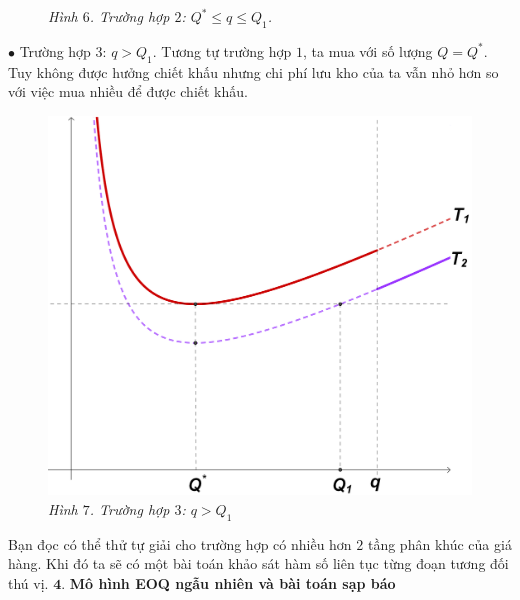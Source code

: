 \begin{multicols}{2}
\begin{figure}[H]
		\caption{\small\textit{\color{toanhocdoisong}Hình $6$. Trường hợp $2$: $Q^* \le q \le Q_1$.}}
		\vspace*{-10pt}
	\end{figure}
	$\bullet$ Trường hợp $3$: $q>Q_1$. Tương tự trường hợp $1$, ta mua với số lượng $Q=Q^*$. Tuy không được hưởng chiết khấu nhưng chi phí lưu kho của ta vẫn nhỏ hơn so với việc mua nhiều để được chiết khấu.
	\begin{figure}[H]
		\centering
		\captionsetup{labelformat= empty, justification=centering}
		\includegraphics[width= 1\linewidth]{8}
		\caption{\small\textit{\color{toanhocdoisong}Hình $7$. Trường hợp $3$: $q>Q_1$}}
		\vspace*{-10pt}
	\end{figure}
	Bạn đọc có thể thử tự giải cho trường hợp có nhiều hơn $2$ tầng phân khúc của giá hàng. Khi đó ta sẽ có một bài toán khảo sát hàm số liên tục từng đoạn tương đối thú vị.
	\vskip 0.1cm
	$\pmb{4.}$ \textbf{\color{toanhocdoisong}Mô hình EOQ ngẫu nhiên và bài toán sạp báo}
	\begin{figure}[H]
		\vspace*{-5pt}
		\centering
		\captionsetup{labelformat= empty, justification=centering}

\end{figure}
\end{multicols}
